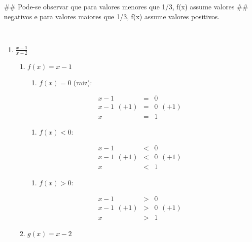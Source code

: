 \documentclass[]{book}
\newenvironment{Shaded}{\begin{snugshade}}{\end{snugshade}}
\newcommand{\NormalTok}[1]{#1}
\providecommand{\tightlist}{%
  \setlength{\itemsep}{0pt}\setlength{\parskip}{0pt}}
\begin{document}
\begin{enumerate}
\begin{Shaded}
\begin{Highlighting}[]
\NormalTok{##  Pode-se observar que para valores menores que 1/3, f(x) assume valores}
\NormalTok{## negativos e para valores maiores que 1/3, f(x) assume valores positivos.}
\end{Highlighting}
\end{Shaded}

  ~

  \begin{enumerate}
  \def\labelenumii{\alph{enumii})}
  \setcounter{enumii}{4}
  \item
    \(\frac{x-1}{x-2}\)

    \begin{enumerate}
    \def\labelenumiii{\roman{enumiii})}
    \item
      \(f(x) = x-1\)

      \begin{enumerate}
      \def\labelenumiv{\Roman{enumiv})}
      \tightlist
      \item
        \(f(x) = 0\) (raiz):
      \end{enumerate}

      \begin{eqnarray}
      x-1 &=& 0 \nonumber \\
      x-1 \ \ (+1) &=& 0 \ \ (+1) \nonumber \\
      x &=& 1 \nonumber
      \end{eqnarray}

      \begin{enumerate}
      \def\labelenumiv{\Roman{enumiv})}
      \setcounter{enumiv}{1}
      \tightlist
      \item
        \(f(x) < 0\):
      \end{enumerate}

      \begin{eqnarray}
      x-1 &<& 0 \nonumber \\
      x-1 \ \ (+1) &<& 0 \ \ (+1) \nonumber \\
      x &<& 1 \nonumber
      \end{eqnarray}

      \begin{enumerate}
      \def\labelenumiv{\Roman{enumiv})}
      \setcounter{enumiv}{2}
      \tightlist
      \item
        \(f(x) > 0\):
      \end{enumerate}

      \begin{eqnarray}
      x-1 &>& 0 \nonumber \\
      x-1 \ \ (+1) &>& 0 \ \ (+1) \nonumber \\
      x &>& 1 \nonumber
      \end{eqnarray}
    \item
      \(g(x) = x-2\)


\end{enumerate}
\end{enumerate}
\end{enumerate}
\end{document}
